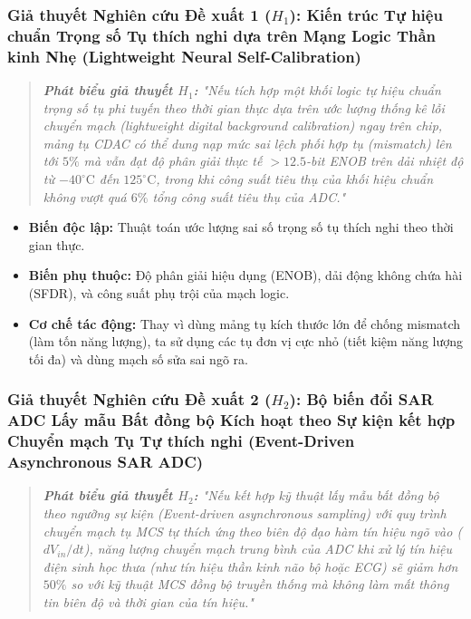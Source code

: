 \documentclass[12pt,a4paper]{article}
\begin{document}
\subsubsection{Giả thuyết Nghiên cứu Đề xuất 1 \texorpdfstring{($H_1$)}{(H1)}: Kiến trúc Tự hiệu chuẩn Trọng số Tụ thích nghi dựa trên Mạng Logic Thần kinh Nhẹ (Lightweight Neural Self-Calibration)}
\begin{quote}
\textit{\textbf{Phát biểu giả thuyết $H_1$:} "Nếu tích hợp một khối logic tự hiệu chuẩn trọng số tụ phi tuyến theo thời gian thực dựa trên ước lượng thống kê lỗi chuyển mạch (lightweight digital background calibration) ngay trên chip, mảng tụ CDAC có thể dung nạp mức sai lệch phối hợp tụ (mismatch) lên tới $5\%$ mà vẫn đạt độ phân giải thực tế $> 12.5$-bit ENOB trên dải nhiệt độ từ $-40^\circ\text{C}$ đến $125^\circ\text{C}$, trong khi công suất tiêu thụ của khối hiệu chuẩn không vượt quá $6\%$ tổng công suất tiêu thụ của ADC."}
\end{quote}

\begin{itemize}
    \item \textbf{Biến độc lập:} Thuật toán ước lượng sai số trọng số tụ thích nghi theo thời gian thực.
    \item \textbf{Biến phụ thuộc:} Độ phân giải hiệu dụng (ENOB), dải động không chứa hài (SFDR), và công suất phụ trội của mạch logic.
    \item \textbf{Cơ chế tác động:} Thay vì dùng mảng tụ kích thước lớn để chống mismatch (làm tốn năng lượng), ta sử dụng các tụ đơn vị cực nhỏ (tiết kiệm năng lượng tối đa) và dùng mạch số sửa sai ngõ ra.
\end{itemize}

\subsubsection{Giả thuyết Nghiên cứu Đề xuất 2 \texorpdfstring{($H_2$)}{(H2)}: Bộ biến đổi SAR ADC Lấy mẫu Bất đồng bộ Kích hoạt theo Sự kiện kết hợp Chuyển mạch Tụ Tự thích nghi (Event-Driven Asynchronous SAR ADC)}
\begin{quote}
\textit{\textbf{Phát biểu giả thuyết $H_2$:} "Nếu kết hợp kỹ thuật lấy mẫu bất đồng bộ theo ngưỡng sự kiện (Event-driven asynchronous sampling) với quy trình chuyển mạch tụ MCS tự thích ứng theo biên độ đạo hàm tín hiệu ngõ vào ($dV_{in}/dt$), năng lượng chuyển mạch trung bình của ADC khi xử lý tín hiệu điện sinh học thưa (như tín hiệu thần kinh não bộ hoặc ECG) sẽ giảm hơn $50\%$ so với kỹ thuật MCS đồng bộ truyền thống mà không làm mất thông tin biên độ và thời gian của tín hiệu."}
\end{quote}
\end{document}
